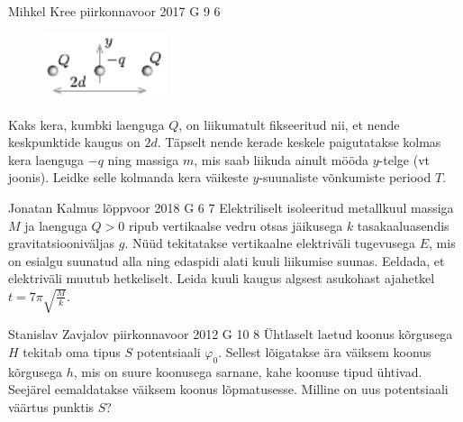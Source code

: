 \documentclass[11pt, twoside]{article}
\begin{document}
{%
{Mihkel Kree} %
{piirkonnavoor} %
{2017} %
{G 9} %
{6} %
{
\ifStatement
\begin{figure}
	\vspace{-25pt}
	\begin{center}
		\includegraphics[width=0.32\textwidth]{2017-v2g-09-laengudjoonis.pdf}
	\end{center}
	\vspace{-10pt}
\end{figure}

Kaks kera, kumbki laenguga $Q$, on liikumatult fikseeritud nii, et nende keskpunktide kaugus on $2d$. Täpselt nende kerade keskele paigutatakse kolmas kera laenguga $-q$ ning massiga $m$, mis saab liikuda ainult mööda $y$-telge (vt joonis). Leidke selle kolmanda kera väikeste $y$-suunaliste võnkumiste periood $T$.
\fi
}

{Jonatan Kalmus} %
{lõppvoor} %
{2018} %
{G 6} %
{7} %
{
\ifStatement
Elektriliselt isoleeritud metallkuul massiga $M$ ja laenguga $Q>0$ ripub vertikaalse vedru otsas jäikusega $k$ tasakaaluasendis gravitatsiooniväljas $g$. Nüüd tekitatakse vertikaalne elektriväli tugevusega $E$, mis on esialgu suunatud alla ning edaspidi alati kuuli liikumise suunas. Eeldada, et elektriväli muutub hetkeliselt. Leida kuuli kaugus algsest asukohast ajahetkel $t=7\pi \sqrt{\frac{M}{k}}$.
\fi
}

{Stanislav Zavjalov} %
{piirkonnavoor} %
{2012} %
{G 10} %
{8} %
{
\ifStatement
Ühtlaselt laetud koonus kõrgusega $H$ tekitab oma tipus $S$ potentsiaali
$\varphi_0$. Sellest lõigatakse ära väiksem koonus kõrgusega $h$, mis on suure
koonusega sarnane, kahe koonuse tipud ühtivad. Seejärel eemaldatakse väiksem koonus
lõpmatusesse. Milline on uus potentsiaali väärtus punktis $S$?
\fi
}

}
\end{document}
